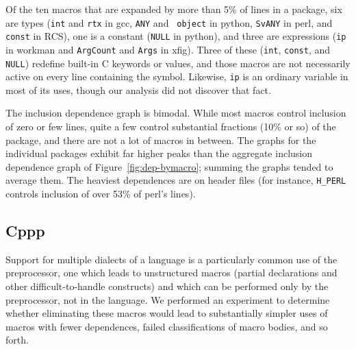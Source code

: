 \documentclass[10pt]{article}
\newcommand{\pkg}[1]{\textsf{#1}}
\begin{document}
Of the ten macros that are expanded by more than 5\% of lines in a package,
six are types ({\tt int} and {\tt rtx} in \pkg{gcc}, {\tt ANY} and {\tt
object} in \pkg{python}, {\tt SvANY} in \pkg{perl}, and {\tt const} in
RCS), one is a constant ({\tt NULL} in python), and three are expressions
({\tt ip} in \pkg{workman} and {\tt ArgCount} and {\tt Args} in
\pkg{xfig}).  Three of these ({\tt int}, {\tt const}, and {\tt NULL})
redefine built-in C keywords or values, and those macros are not
necessarily active on every line containing the symbol.  Likewise, {\tt ip}
is an ordinary variable in most of its uses, though our analysis did not
discover that fact.

% 
% 



The inclusion dependence graph is bimodal.  While most macros control
inclusion of zero or few lines, quite a few control substantial
fractions (10\% or so) of the package, and there are not a lot of macros in
between.  The graphs for the individual packages exhibit far higher peaks
than the aggregate inclusion dependence graph of
Figure~\ref{fig:dep-bymacro}; summing the graphs tended to average them.
The heaviest dependences are on header files (for instance, \verb|H_PERL|
controls inclusion of over 53\% of \pkg{perl}'s lines).



\subsection{Cppp}

Support for multiple dialects of a language is a particularly common use of
the preprocessor, one which leads to unstructured macros (partial
declarations and other difficult-to-handle constructs) and which can be
performed only by the preprocessor, not in the language.  We performed an
experiment to determine whether eliminating these macros would lead to
substantially simpler uses of macros with fewer dependences, failed
classifications of macro bodies, and so forth.
\end{document}
